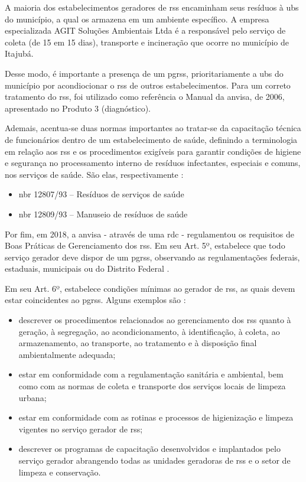 	A maioria dos estabelecimentos geradores de \gls{rss} encaminham seus resíduos à \gls{ubs} do município, a qual os armazena em um ambiente específico. A  empresa especializada AGIT Soluções Ambientais Ltda é a responsável pelo serviço de coleta (de 15 em 15 dias), transporte e incineração que ocorre no município de Itajubá. 
	
	Desse modo, é importante a presença de um \gls{pgrss}, prioritariamente a \gls{ubs} do município por acondiocionar o \gls{rss} de outros estabelecimentos. Para um correto tratamento do \gls{rss}, foi utilizado como referência o Manual da \gls{anvisa}, de 2006, apresentado no Produto 3 (diagnóstico).
	
	Ademais, acentua-se duas normas importantes ao tratar-se da capacitação técnica de funcionários dentro de um estabelecimento de saúde, definindo a terminologia em relação aos \gls{rss} e os procedimentos exigíveis para garantir condições de higiene e segurança no processamento interno de resíduos infectantes, especiais e comuns, nos serviços de saúde. São elas, respectivamente \cite{abnt:12807:1993, abnt:12809:1993}:
	
	\begin{itemize}
		\item \gls{nbr} 12807/93 – Resíduos de serviços de saúde
		\item \gls{nbr} 12809/93 – Manuseio de resíduos de saúde
	\end{itemize}
	
	Por fim, em 2018, a \gls{anvisa} - através de uma \gls{rdc} - regulamentou os requisitos de Boas Práticas de Gerenciamento dos \gls{rss}. Em seu Art. 5º, estabelece que todo serviço gerador deve dispor de um \gls{pgrss}, observando as regulamentações federais, estaduais, municipais ou do Distrito Federal \cite{anvisa:222:2018}.

	
	Em seu Art. 6º, estabelece condições mínimas ao gerador de \gls{rss}, as quais devem estar coincidentes ao \gls{pgrss}. Alguns exemplos são \cite{anvisa:222:2018}:
	
	\begin{itemize}
		\item descrever os procedimentos relacionados ao gerenciamento dos \gls{rss} quanto à geração, à segregação, ao acondicionamento, à identificação, à coleta, ao armazenamento, ao transporte, ao tratamento e à disposição final ambientalmente adequada;
		\item  estar em conformidade com a regulamentação sanitária e ambiental, bem como com as normas de coleta e transporte dos serviços locais de limpeza urbana;

		\item estar em conformidade com as rotinas e processos de higienização e limpeza	vigentes no serviço gerador de \gls{rss};
		\item descrever os programas de capacitação desenvolvidos e implantados pelo serviço gerador abrangendo todas as unidades geradoras de \gls{rss} e o setor de limpeza e conservação.
	\end{itemize}
	
